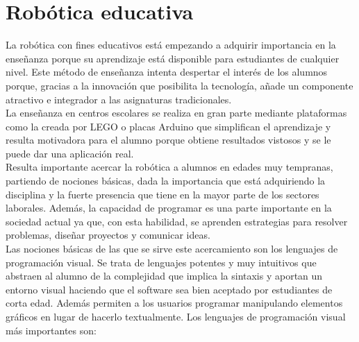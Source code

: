 \section{Robótica educativa}
\label{sec:educativa}
La robótica con fines educativos está empezando a adquirir importancia en la enseñanza porque su aprendizaje está disponible para estudiantes de cualquier nivel. Este método de enseñanza intenta despertar el interés de los alumnos porque, gracias a la innovación que posibilita la tecnología, añade un componente atractivo e integrador a las asignaturas tradicionales. \\

La enseñanza en centros escolares se realiza en gran parte mediante plataformas como la creada por LEGO o placas Arduino que simplifican el aprendizaje y resulta motivadora para el alumno porque obtiene resultados vistosos y se le puede dar una aplicación real. \\

Resulta importante acercar la robótica a alumnos en edades muy tempranas, partiendo de nociones básicas, dada la importancia que está adquiriendo la disciplina y la fuerte presencia que tiene en la mayor parte de los sectores laborales. Además, la capacidad de programar es una parte importante en la sociedad actual ya que, con esta habilidad, se aprenden estrategias para resolver problemas, diseñar proyectos y comunicar ideas. \\


Las nociones básicas de las que se sirve este acercamiento son los lenguajes de programación visual. Se trata de lenguajes potentes y muy intuitivos que abstraen al alumno de la complejidad que implica la sintaxis y aportan un entorno visual haciendo que el software sea bien aceptado por estudiantes de corta edad. Además permiten a los usuarios programar manipulando elementos gráficos en lugar de hacerlo textualmente. Los lenguajes de programación visual más importantes son: 

